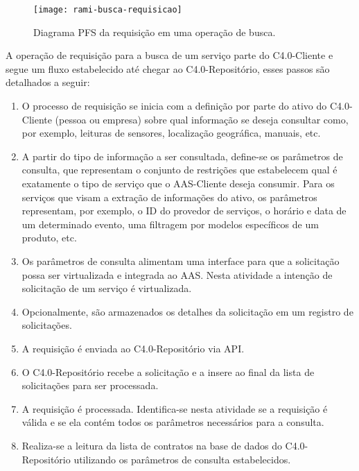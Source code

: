 \begin{figure}[th]
	\centering
	\texttt{[image: rami-busca-requisicao]}
	\caption{Diagrama PFS da requisição em uma operação de busca.}
	\label{fig:rami-busca-requisicao}
\end{figure}

A operação de requisição para a busca de um serviço parte do C4.0-Cliente e segue um fluxo estabelecido até chegar ao C4.0-Repositório, esses passos são detalhados a seguir:

\begin{enumerate}

	\item O processo de requisição se inicia com a definição por parte do ativo do C4.0-Cliente (pessoa ou empresa) sobre qual informação se deseja consultar como, por exemplo, leituras de sensores, localização geográfica, manuais, etc.

	\item A partir do tipo de informação a ser consultada, define-se os parâmetros de consulta, que representam o conjunto de restrições que estabelecem qual é exatamente o tipo de serviço que o AAS-Cliente deseja consumir. Para os serviços que visam a extração de informações do ativo, os parâmetros representam, por exemplo, o ID do provedor de serviços, o horário e data de um determinado evento, uma filtragem por modelos específicos de um produto, etc.

	\item Os parâmetros de consulta alimentam uma interface para que a solicitação possa ser virtualizada e integrada ao AAS. Nesta atividade a intenção de solicitação de um serviço é virtualizada.

	\item Opcionalmente, são armazenados os detalhes da solicitação em um registro de solicitações.

	\item A requisição é enviada ao C4.0-Repositório via API.

	\item O C4.0-Repositório recebe a solicitação e a insere ao final da lista de solicitações para ser processada.

	\item A requisição é processada. Identifica-se nesta atividade se a requisição é válida e se ela contém todos os parâmetros necessários para a consulta.

	\item Realiza-se a leitura da lista de contratos na base de dados do C4.0-Repositório utilizando os parâmetros de consulta estabelecidos.

\end{enumerate}

